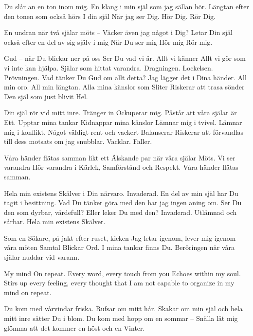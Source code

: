 \startpoem
Du slår an en ton inom mig.
En klang i min själ som jag
sällan hör.
Längtan efter den tonen som också hörs
I din själ
När jag ser Dig.
Hör Dig.
Rör Dig.


En undran 
när två själar möts – 
Väcker även jag något i Dig?
Letar Din själ också efter
en del av sig själv i mig
När Du ser mig
Hör mig
Rör mig.
\stoppoem

\startpoem
Gud – när Du blickar ner på oss
Ser Du vad vi är.
Allt vi känner
Allt vi gör som vi inte kan hjälpa.
Själar som hittat 
varandra.
Dragningen.
Lockelsen.
Prövningen.
Vad tänker Du Gud om allt detta?
Jag lägger det i Dina händer.
All min oro.
All min längtan.
Alla mina känslor som
Sliter
Riskerar att trasa sönder
Den själ som just blivit 
Hel.
\stoppoem

\startpoem
Din själ
rör vid mitt inre.
Tränger in
Ockuperar mig.
Påstår att våra själar är
Ett.
Upptar mina tankar
Kidnappar mina känslor
Lämnar mig i tvivel.
Lämnar mig i konflikt.
Något väldigt rent och vackert
Balanserar
Riskerar att förvandlas
till dess motsats
om jag snubblar.
Vacklar.
Faller.
\stoppoem

\startpoem
Våra händer
flätas samman
likt ett 
Älskande par
när våra själar 
Möts.
Vi ser varandra
Hör varandra
i Kärlek, 
Samförstånd och
Respekt.
Våra händer
flätas samman.
\stoppoem

\startpoem
Hela min existens
Skälver 
i Din närvaro.
Invaderad.
En del av min själ har Du tagit 
i besittning.
Vad Du tänker göra med den
har jag ingen aning om.
Ser Du den som dyrbar, värdefull?
Eller leker Du med den?
Invaderad.
Utlämnad och sårbar.
Hela min existens 
Skälver.
\stoppoem

\startpoem
Som en Sökare,
på jakt efter ruset, kicken
Jag letar igenom,
lever mig igenom
våra möten
Samtal
Blickar
Ord.
I mina tankar finns
Du.
Beröringen
när våra själar
nuddar vid
varann.
\stoppoem

\startpoem
My mind
On repeat.
Every word,
every touch from you
Echoes within my soul.
Stirs up every feeling,
every thought that I am not capable
to organize
in my mind
on repeat.
\stoppoem

\startpoem
Du kom med vårvindar friska.
Rufsar om mitt hår.
Skakar om min själ och hela mitt inre
sätter Du i blom. 
Du kom med hopp 
om en sommar – 
Snälla låt mig glömma 
att det kommer en höst
och en 
Vinter.
\stoppoem

